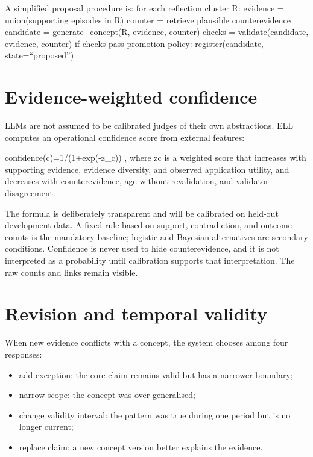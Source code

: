 \documentclass[
  english,
  a4paper,
  DIV=11,
  numbers=noendperiod]{scrreprt}
\providecommand{\tightlist}{%
  \setlength{\itemsep}{0pt}\setlength{\parskip}{0pt}}
\begin{document}
A simplified proposal procedure is: for each reflection cluster R:
evidence = union(supporting episodes in R) counter = retrieve plausible
counterevidence candidate = generate\_concept(R, evidence, counter)
checks = validate(candidate, evidence, counter) if checks pass promotion
policy: register(candidate, state=``proposed'')

\section{Evidence-weighted
confidence}\label{evidence-weighted-confidence}

LLMs are not assumed to be calibrated judges of their own abstractions.
ELL computes an operational confidence score from external features:

confidence(c)=1/(1+exp(-z\_c)) , where zc is a weighted score that
increases with supporting evidence, evidence diversity, and observed
application utility, and decreases with counterevidence, age without
revalidation, and validator disagreement.

The formula is deliberately transparent and will be calibrated on
held-out development data. A fixed rule based on support, contradiction,
and outcome counts is the mandatory baseline; logistic and Bayesian
alternatives are secondary conditions. Confidence is never used to hide
counterevidence, and it is not interpreted as a probability until
calibration supports that interpretation. The raw counts and links
remain visible.

\section{Revision and temporal
validity}\label{revision-and-temporal-validity}

When new evidence conflicts with a concept, the system chooses among
four responses:

\begin{itemize}
\tightlist
\item
  add exception: the core claim remains valid but has a narrower
  boundary;
\item
  narrow scope: the concept was over-generalised;
\item
  change validity interval: the pattern was true during one period but
  is no longer current;
\item
  replace claim: a new concept version better explains the evidence.
\end{itemize}
\end{document}
